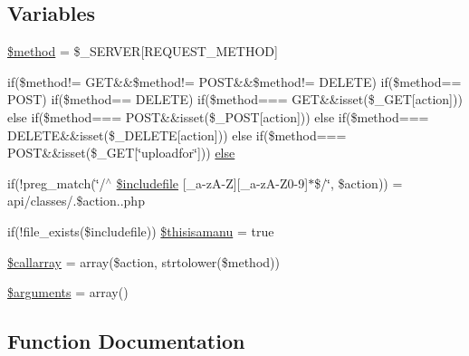 \subsection*{Variables}
\begin{DoxyCompactItemize}
\item 
\hyperlink{index_8php_a12661b2fc0f57f97e30a1620889ce9c6}{\$method} = \$\+\_\+\+S\+E\+R\+V\+E\+R\mbox{[}\textquotesingle{}R\+E\+Q\+U\+E\+S\+T\+\_\+\+M\+E\+T\+H\+O\+D\textquotesingle{}\mbox{]}
\item 
if(\$method!= \textquotesingle{}G\+E\+T\textquotesingle{}\&\&\$method!= \textquotesingle{}P\+O\+S\+T\textquotesingle{}\&\&\$method!= \textquotesingle{}D\+E\+L\+E\+T\+E\textquotesingle{}) if(\$method== \textquotesingle{}P\+O\+S\+T\textquotesingle{}) if(\$method== \textquotesingle{}D\+E\+L\+E\+T\+E\textquotesingle{}) if(\$method=== \textquotesingle{}G\+E\+T\textquotesingle{}\&\&isset(\$\+\_\+\+G\+E\+T\mbox{[}\textquotesingle{}action\textquotesingle{}\mbox{]})) else if(\$method=== \textquotesingle{}P\+O\+S\+T\textquotesingle{}\&\&isset(\$\+\_\+\+P\+O\+S\+T\mbox{[}\textquotesingle{}action\textquotesingle{}\mbox{]})) else if(\$method=== \textquotesingle{}D\+E\+L\+E\+T\+E\textquotesingle{}\&\&isset(\$\+\_\+\+D\+E\+L\+E\+T\+E\mbox{[}\textquotesingle{}action\textquotesingle{}\mbox{]})) else if(\$method=== \textquotesingle{}P\+O\+S\+T\textquotesingle{}\&\&isset(\$\+\_\+\+G\+E\+T\mbox{[}\char`\"{}uploadfor\char`\"{}\mbox{]})) \hyperlink{index_8php_a1d3defe87c04d4fc1443739d3831ebfe}{else}
\item 
if(!preg\+\_\+match(\char`\"{}/$^\wedge$ \hyperlink{index_8php_a1c1b7d1432c2e06063bf8f9ad29ba19d}{\$includefile} \mbox{[}\+\_\+a-\/z\+A-\/Z\mbox{]}\mbox{[}\+\_\+a-\/z\+A-\/Z0-\/9\mbox{]}$\ast$\$/\char`\"{}, \$action)) = \textquotesingle{}api/classes/\textquotesingle{}.\$action.\textquotesingle{}.php\textquotesingle{}
\item 
if(!file\+\_\+exists(\$includefile)) \hyperlink{index_8php_a36df20dc9373bab32c6e4ff30b9093c3}{\$thisisamanu} = true
\item 
\hyperlink{index_8php_a0a2d1b1b87dbb189b9243f333ad904f3}{\$callarray} = array(\$action, strtolower(\$method))
\item 
\hyperlink{index_8php_a61eded163d962fc248b3cf209000979b}{\$arguments} = array()
\end{DoxyCompactItemize}


\subsection{Function Documentation}
\hypertarget{index_8php_a2a4d0fc0c8817862d5c0c4769c909fa3}{}
